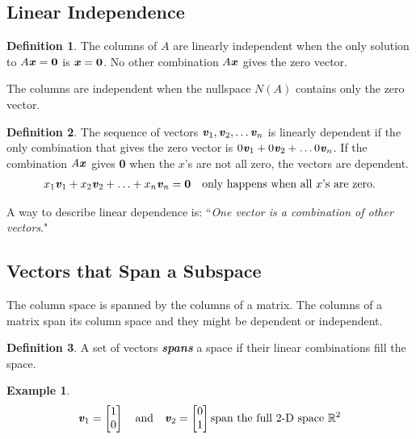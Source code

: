 \documentclass[12pt, letterpaper]{article}
\newcommand{\R}[1]{$\mathbb{R}^{#1}$}
\newcommand{\V}[1]{\textbf{\textit{#1}}}
\newcommand{\A}{$A$}
\newcommand{\x}{\textbf{\textit{x}}}
\newcommand{\nullsystem}{\textbf{\textit{\A\x}} = \textbf{0}}
\newcommand{\DefinitionSpace}{\vspace{15px}}
\theoremstyle{definition}
\newtheorem{definition}{Definition}[section]
\newtheorem{example}{Example}
\begin{document}
	
\subsection{Linear Independence}
\DefinitionSpace
		\begin{definition}
			The columns of $A$ are linearly independent when the only solution to $\nullsystem$ is $\V{x} = \textbf{0}$. No other combination $A\V{x}$ gives the zero vector.
		\end{definition}
\DefinitionSpace

		The columns are independent when the nullspace $N(A)$ contains only the zero vector.
\DefinitionSpace
		\begin{definition}
			The sequence of vectors $\V{v}_1, \V{v}_2, \ldots \V{v}_n$ is linearly dependent if the only combination that gives the zero vector is $0\V{v}_1 + 0\V{v}_2 + \ldots 0\V{v}_n$. If the combination $A\V{x}$ gives \textbf{0} when the $x$'s are not all zero, the vectors are dependent.
\DefinitionSpace		
			\begin{gather*}
				x_1 \V{v}_1+ x_2 \V{v}_2 + \ldots + x_n \V{v}_n = \textbf{0} \quad \text{only happens when all $x$'s are zero.}
			\end{gather*}
		\end{definition}
	
	\noindent A way to describe linear dependence is: ``\textit{One vector is a combination of other vectors}." 	
	
\subsection{Vectors that Span a Subspace}
		The column space is spanned by the columns of a matrix. The columns of a matrix span its column space and they might be dependent or independent.
			\DefinitionSpace
					\begin{definition}
						A set of vectors \textbf{\textit{spans}} a space if their linear combinations fill the space.
					\end{definition}
			\DefinitionSpace
				
					\begin{example}
						\begin{gather*}
							\V{v}_1 = \begin{bmatrix}1 \\ 0 \end{bmatrix} \quad \text{and} \quad \V{v}_2 = \begin{bmatrix}0 \\ 1 \end{bmatrix} \text{span the full 2-D space \R{2}}
						\end{gather*}
					\end{example}
				
\end{document}

